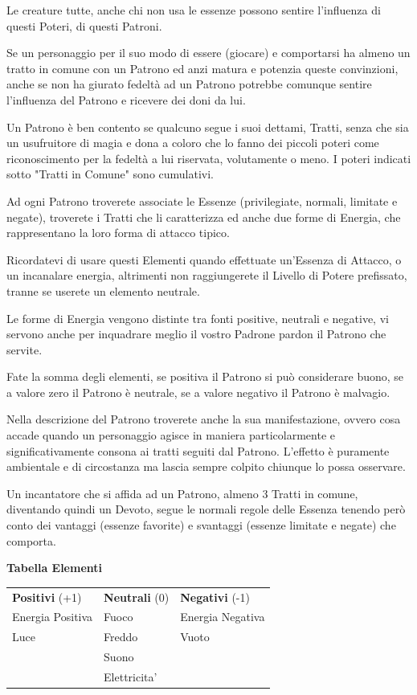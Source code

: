 \documentclass[a4paper,11pt,twoside,openany]{book}
\begin{document}
Le creature tutte, anche chi non usa le essenze possono sentire l'influenza di questi Poteri, di questi Patroni.

Se un personaggio per il suo modo di essere (giocare) e comportarsi ha almeno un tratto in comune con un Patrono ed anzi matura e potenzia queste convinzioni, anche se non ha giurato fedeltà ad un Patrono potrebbe comunque sentire l'influenza del Patrono e ricevere dei doni da lui.

Un Patrono è ben contento se qualcuno segue i suoi dettami, Tratti, senza che sia un usufruitore di magia e dona a coloro che lo fanno dei piccoli poteri come riconoscimento per la fedeltà a lui riservata, volutamente o meno. I poteri indicati sotto "Tratti in Comune" sono cumulativi.

Ad ogni Patrono troverete associate le Essenze (privilegiate, normali, limitate e negate), troverete i Tratti che li caratterizza ed anche due forme di Energia, che rappresentano la loro forma di attacco tipico.

Ricordatevi di usare questi Elementi quando effettuate un'Essenza di Attacco, o un incanalare energia, altrimenti non raggiungerete il Livello di Potere prefissato, tranne se userete un elemento neutrale.

Le forme di Energia vengono distinte tra fonti positive, neutrali e negative, vi servono anche per inquadrare meglio il vostro Padrone pardon il Patrono che servite.

Fate la somma degli elementi, se positiva il Patrono si può considerare buono, se a valore zero il Patrono è neutrale, se a valore negativo il Patrono è malvagio.

Nella descrizione del Patrono troverete anche la sua manifestazione, ovvero cosa accade quando un personaggio agisce in maniera particolarmente e significativamente consona ai tratti seguiti dal Patrono. L'effetto è puramente ambientale e di circostanza ma lascia sempre colpito chiunque lo possa osservare.

Un incantatore che si affida ad un Patrono, almeno 3 Tratti in comune, diventando quindi un Devoto, segue le normali regole delle Essenza tenendo però conto dei vantaggi (essenze favorite) e svantaggi (essenze limitate e negate) che comporta.

\bigskip

\textbf{Tabella Elementi}
\medskip

\begin{tabular}{lll}
	\toprule
	\textbf{Positivi} (+1) & \textbf{Neutrali} (0) & \textbf{Negativi} (-1)\\
	Energia Positiva       & Fuoco                 & Energia Negativa\\
	Luce                   & Freddo                & Vuoto\\
	                       & Suono                 & \\
	                       & Elettricita'          & \\
\end{tabular}
\bigskip
\end{document}
